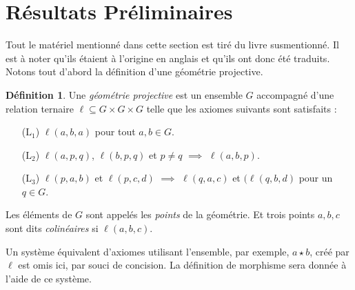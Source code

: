 \documentclass[12pt, oneside]{memoir}
\theoremstyle{definition}
\newtheorem{defn}{Définition}
\begin{document}
\section*{Résultats Préliminaires}
Tout le matériel mentionné dans cette section est tiré du
livre susmentionné. Il est à noter qu'ils étaient à l'origine en
anglais et qu'ils ont donc été traduits.  Notons tout d'abord la
définition d'une géométrie projective.
\begin{defn}
  Une \textit{géométrie projective} est un ensemble $G$ accompagné
  d'une relation ternaire $\ell \subseteq G \times G \times G$ telle
  que les axiomes suivants sont satisfaits :
  \begin{itemize}[align=left]
  \item[($\text{L}_1$)] $\ell(a,b,a)$ pour tout $a, b \in G$.
  \item[($\text{L}_2$)] $\ell(a,p,q)$, $\ell(b,p,q)$ et $p \neq q$
    $\implies$ $\ell(a,b,p)$.
  \item[($\text{L}_3$)] $\ell(p,a,b)$ et $\ell(p,c,d)$ $\implies$
    $\ell(q,a,c)$ et $(\ell(q,b,d)$ pour un $q \in G$.
  \end{itemize}
  Les éléments de $G$ sont appelés les \textit{points} de la
  géométrie. Et trois points $a, b, c$ sont dits \textit{colinéaires}
  si $\ell(a,b,c)$.
\end{defn}
Un système équivalent d'axiomes utilisant l'ensemble, par exemple,
$a \star b$, créé par $\ell$ est omis ici, par souci de concision. La
définition de morphisme sera donnée à l'aide de ce système.
\end{document}
